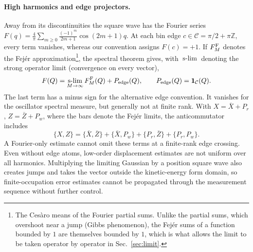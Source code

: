 \documentclass[11pt,a4paper]{article}
\begin{document}
\paragraph{High harmonics and edge projectors.}
Away from its discontinuities the square wave has the Fourier series $F(q)=\frac4\pi\sum_{m\ge0}\frac{(-1)^m}{2m+1}\cos(2m+1)q$. At each bin edge $c\in\mathcal C=\pi/2+\pi\mathbb Z$, every term vanishes, whereas our convention assigns $F(c)=+1$. If $F_M^{\rm F}$ denotes the Fej\'er approximation\footnote{The Ces\`aro means of the Fourier partial sums. Unlike the partial sums, which overshoot near a jump (Gibbs phenomenon), the Fej\'er sums of a function bounded by $1$ are themselves bounded by $1$, which is what allows the limit to be taken operator by operator in Sec.~\ref{sec:limit}.}, the spectral theorem gives, with $\operatorname{s-lim}$ denoting the strong operator limit (convergence on every vector),
\begin{equation}
F(Q)=\operatorname*{s-lim}_{M\to\infty}F_M^{\rm F}(Q)+P_{\rm edge}(Q),\qquad
P_{\rm edge}(Q)=\mathbf1_{\mathcal C}(Q).
\label{eq:edgeFourier}
\end{equation}
The last term has a minus sign for the alternative edge convention. It vanishes for the oscillator spectral measure, but generally not at finite rank. With $X=\bar X+P_r$, $Z=\bar Z+P_w$, where the bars denote the Fej\'er limits, the anticommutator includes
\begin{equation}
\{X,Z\}=\{\bar X,\bar Z\}+\{\bar X,P_w\}+\{P_r,\bar Z\}+\{P_r,P_w\}.
\label{eq:edgeAnti}
\end{equation}
A Fourier-only estimate cannot omit these terms at a finite-rank edge crossing. Even without edge atoms, low-order displacement estimates are not uniform over all harmonics. Multiplying the limiting Gaussian by a position square wave also creates jumps and takes the vector outside the kinetic-energy form domain, so finite-occupation error estimates cannot be propagated through the measurement sequence without further control.
\end{document}
